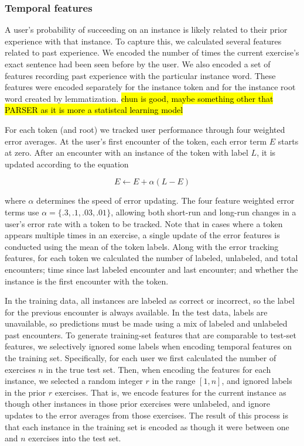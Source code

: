 \documentclass[11pt,a4paper]{article}
\begin{document}
\subsubsection{Temporal features}

A user's probability of succeeding on an instance is likely related to their
prior experience with that instance. To capture this, we calculated several
features related to past experience. We encoded the number of times the
current exercise's exact sentence had been seen before by the user. 
We also encoded a set of features recording past experience with
the particular instance word. These features were encoded separately for the
instance token and for the instance root word created by lemmatization.
\cite{Perruchet:1998nw,Chun:1999gt} \hl{chun is good, maybe something other
that PARSER as it is more a statistcal learning model}


For each token (and root) we tracked user performance through four weighted
error averages. At the user's first encounter of the token, each error term $E$ starts at
zero. After an encounter with an instance of the token with label $L$, it is
updated according to the equation

\[
E \leftarrow E + \alpha (L - E)
\]

where $\alpha$ determines the speed of error updating. The four feature weighted
error terms use $\alpha = \{.3, .1, .03, .01\}$, allowing both short-run and
long-run changes in a user's error rate with a token to be tracked. Note that in
cases where a token appears multiple times in an exercise, a single update of
the error features is conducted using the mean of the token labels.
Along with the error tracking features, for each token we calculated the number
of labeled, unlabeled, and total encounters; time since last labeled encounter and
last encounter; and whether the instance is the first encounter with the
token.

In the training data, all instances are labeled as correct or incorrect, so the
label for the previous encounter is always available. In the test data, labels
are unavailable, so predictions must be made using a mix of labeled and
unlabeled past encounters. To generate training-set features that are 
comparable to test-set features, we selectively ignored some labels when encoding temporal features on
the training set. Specifically, for each user we first calculated the number of
exercises $n$ in the true test set. Then, when encoding the features for each
instance, we selected a random integer $r$ in the range $[1,n]$, and ignored labels
in the prior $r$ exercises. That is, we encode features for the current instance
as though other instances in those prior exercises were unlabeled, and ignore
updates to the error averages from those exercises. The result of this process
is that each instance in the training set is encoded as though it were between
one and $n$ exercises into the test set.
\end{document}
